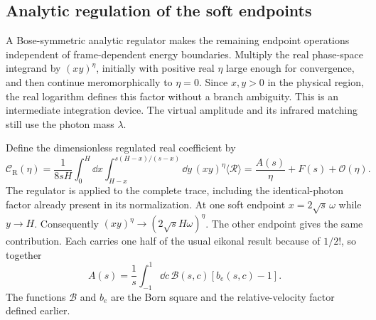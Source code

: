 \subsection{Analytic regulation of the soft endpoints}
A Bose-symmetric analytic regulator makes the remaining endpoint
operations independent of frame-dependent energy boundaries.
Multiply the real phase-space integrand by $(xy)^\eta$, initially
with positive real $\eta$ large enough for convergence, and then
continue meromorphically to $\eta=0$. Since $x,y>0$ in the physical
region, the real logarithm defines this factor without a branch
ambiguity. This is an intermediate integration device. The virtual
amplitude and its infrared matching still use the photon mass
$\lambda$.

Define the dimensionless regulated real coefficient by
\begin{equation}
 \mathcal C_{\mathrm R}(\eta)=\frac1{8sH}
 \int_0^H\dd x\int_{H-x}^{s(H-x)/(s-x)}\dd y\,
     (xy)^\eta\langle\mathcal R\rangle
 =\frac{A(s)}{\eta}+F(s)+\mathcal O(\eta).
 \label{eq:comp-real-analytic-regulator}
\end{equation}
The regulator is applied to the complete trace, including the
identical-photon factor already present in its normalization.
At one soft endpoint $x=2\sqrt{s}\,\omega$ while $y\to H$.
Consequently $(xy)^\eta\to(2\sqrt{s}H\omega)^\eta$.
The other endpoint gives the same contribution. Each carries
one half of the usual eikonal result because of $1/2!$, so together
\begin{equation}
 A(s)=\frac1s\int_{-1}^1\dd c\,
             \mathcal B(s,c)[b_e(s,c)-1].
 \label{eq:comp-real-pole-residue}
\end{equation}
The functions $\mathcal B$ and $b_e$ are the Born square and the
relative-velocity factor defined earlier.

